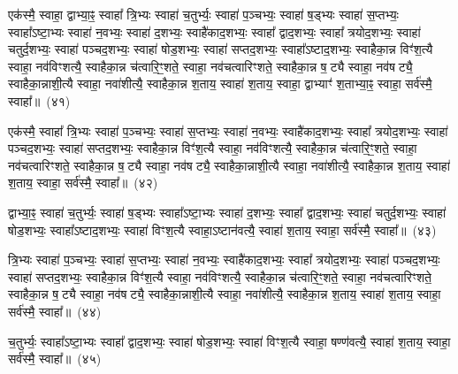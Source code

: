 {\anuvakamend[{अय॑च्छ॒दधि॑ रभते द्वादशा॒हेन॑ च॒त्वारि॑ च}]}%

एक॑स्मै॒ स्वाहा॒ द्वाभ्या॒ꣴ॒ स्वाहा᳚ त्रि॒भ्यः स्वाहा॑ च॒तुर्भ्यः॒ स्वाहा॑ प॒ञ्चभ्यः॒ स्वाहा॑ ष॒ड्भ्यः स्वाहा॑ स॒प्तभ्यः॒ स्वाहा᳚\-ऽष्टा॒भ्यः स्वाहा॑ न॒वभ्यः॒ स्वाहा॑ द॒शभ्यः॒ स्वाहै॑काद॒शभ्यः॒ स्वाहा᳚ द्वाद॒शभ्यः॒ स्वाहा᳚ त्रयोद॒शभ्यः॒ स्वाहा॑ चतुर्द॒शभ्यः॒ स्वाहा॑ पञ्चद॒शभ्यः॒ स्वाहा॑ षोड॒शभ्यः॒ स्वाहा॑ सप्तद॒शभ्यः॒ स्वाहा᳚\-ऽष्टाद॒शभ्यः॒ स्वाहैका॒न्न विꣳ॑श॒त्यै स्वाहा॒ नव॑विꣳशत्यै॒ स्वाहैका॒न्न च॑त्वारि॒ꣳ॒शते॒ स्वाहा॒ नव॑चत्वारिꣳशते॒ स्वाहैका॒न्न ष॒ट्यै स्वाहा॒ नव॑षट्यै॒ स्वाहैका॒न्नाशी॒त्यै स्वाहा॒ नवा॑शीत्यै॒ स्वाहैका॒न्न श॒ताय॒ स्वाहा॑ श॒ताय॒ स्वाहा॒ द्वाभ्याꣳ॑ श॒ताभ्या॒ꣴ॒ स्वाहा॒ सर्व॑स्मै॒ स्वाहा᳚॥~(४१)

{}%

एक॑स्मै॒ स्वाहा᳚ त्रि॒भ्यः स्वाहा॑ प॒ञ्चभ्यः॒ स्वाहा॑ स॒प्तभ्यः॒ स्वाहा॑ न॒वभ्यः॒ स्वाहै॑काद॒शभ्यः॒ स्वाहा᳚ त्रयोद॒शभ्यः॒ स्वाहा॑ पञ्चद॒शभ्यः॒ स्वाहा॑ सप्तद॒शभ्यः॒ स्वाहैका॒न्न विꣳ॑श॒त्यै स्वाहा॒ नव॑विꣳशत्यै॒ स्वाहैका॒न्न च॑त्वारि॒ꣳ॒शते॒ स्वाहा॒ नव॑चत्वारिꣳशते॒ स्वाहैका॒न्न ष॒ट्यै स्वाहा॒ नव॑षट्यै॒ स्वाहैका॒न्नाशी॒त्यै स्वाहा॒ नवा॑शीत्यै॒ स्वाहैका॒न्न श॒ताय॒ स्वाहा॑ श॒ताय॒ स्वाहा॒ सर्व॑स्मै॒ स्वाहा᳚॥~(४२)

{\anuvakamend[{एक॑स्मै त्रि॒भ्यः प॑ञ्चा॒शत्}]}%

द्वाभ्या॒ꣴ॒ स्वाहा॑ च॒तुर्भ्यः॒ स्वाहा॑ ष॒ड्भ्यः स्वाहा᳚\-ऽष्टा॒भ्यः स्वाहा॑ द॒शभ्यः॒ स्वाहा᳚ द्वाद॒शभ्यः॒ स्वाहा॑ चतुर्द॒शभ्यः॒ स्वाहा॑ षोड॒शभ्यः॒ स्वाहा᳚\-ऽष्टाद॒शभ्यः॒ स्वाहा॑ विꣳश॒त्यै स्वाहा॒\-ऽष्टान॑वत्यै॒ स्वाहा॑ श॒ताय॒ स्वाहा॒ सर्व॑स्मै॒ स्वाहा᳚॥~(४३)

{\anuvakamend[{द्वाभ्या॑म॒ष्टान॑वत्यै॒ षड्विꣳ॑शतिः}]}%

त्रि॒भ्यः स्वाहा॑ प॒ञ्चभ्यः॒ स्वाहा॑ स॒प्तभ्यः॒ स्वाहा॑ न॒वभ्यः॒ स्वाहै॑काद॒शभ्यः॒ स्वाहा᳚ त्रयोद॒शभ्यः॒ स्वाहा॑ पञ्चद॒शभ्यः॒ स्वाहा॑ सप्तद॒शभ्यः॒ स्वाहैका॒न्न विꣳ॑श॒त्यै स्वाहा॒ नव॑विꣳशत्यै॒ स्वाहैका॒न्न च॑त्वारि॒ꣳ॒शते॒ स्वाहा॒ नव॑चत्वारिꣳशते॒ स्वाहैका॒न्न ष॒ट्यै स्वाहा॒ नव॑षट्यै॒ स्वाहैका॒न्नाशी॒त्यै स्वाहा॒ नवा॑शीत्यै॒ स्वाहैका॒न्न श॒ताय॒ स्वाहा॑ श॒ताय॒ स्वाहा॒ सर्व॑स्मै॒ स्वाहा᳚॥~(४४)

{\anuvakamend[{त्रि॒भ्यो᳚\-ऽष्टाचत्वारि॒ꣳ॒शत्}]}%

च॒तुर्भ्यः॒ स्वाहा᳚\-ऽष्टा॒भ्यः स्वाहा᳚ द्वाद॒शभ्यः॒ स्वाहा॑ षोड॒शभ्यः॒ स्वाहा॑ विꣳश॒त्यै स्वाहा॒ षण्ण॑वत्यै॒ स्वाहा॑ श॒ताय॒ स्वाहा॒ सर्व॑स्मै॒ स्वाहा᳚॥~(४५)

